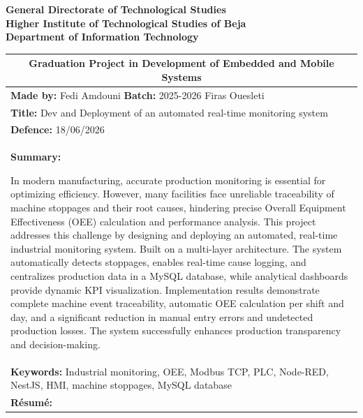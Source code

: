 \thispagestyle{plain}

\begin{center}
  {\large\bfseries General Directorate of Technological Studies}\\
  {\large\bfseries Higher Institute of Technological Studies of Beja}\\
  {\large\bfseries Department of Information Technology}
\end{center}



\begin{center}
\renewcommand{\arraystretch}{1.3}
\begin{tabular}{|p{14.5cm}|}
\hline
\multicolumn{1}{|c|}{\textbf{Graduation Project in Development of Embedded and Mobile Systems}} \\
\hline
\textbf{Made by:} Fedi Amdouni \hfill \textbf{Batch:} 2025-2026 \newline
 \hspace*{1.86cm} Firas Ouesleti \\
\hline
\textbf{Title:} Dev and Deployment of an automated real-time monitoring system \\
\hline
\textbf{Defence:} 18/06/2026 \\
\hline
\textbf{Summary:}
\vspace{0.1cm}

In modern manufacturing, accurate production monitoring is
essential for optimizing efficiency. However, many facilities 
face unreliable traceability of machine stoppages and their root causes, 
hindering precise Overall Equipment Effectiveness (OEE) calculation and performance analysis. 
This project addresses this challenge by designing and deploying an automated, real-time industrial
monitoring system. Built on a multi-layer architecture. The system automatically detects stoppages, enables real-time cause logging, and centralizes production data in a MySQL database, while analytical dashboards provide dynamic KPI visualization. Implementation results demonstrate complete machine event traceability, automatic OEE calculation per shift and day, and a significant reduction in manual entry errors and undetected production losses. The system successfully enhances production transparency and decision-making.
\vspace{0.2cm}
\\
\hline
\textbf{Keywords:} Industrial monitoring, OEE, Modbus TCP, PLC, Node-RED, NestJS, HMI, machine stoppages, MySQL database \\
\hline\hline  \hline  
\textbf{Résumé:}
\vspace{0.1cm}


\end{tabular}
\end{center}
